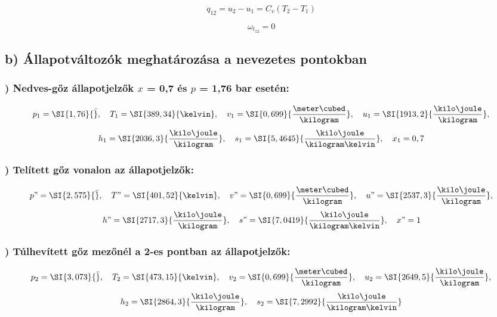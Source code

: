 \begin{equation}
	q_{12}=u_2-u_1=C_v(T_2-T_1)
\end{equation}

\begin{equation}
	\omega_{t_{12}}=0	
\end{equation}

\subsection*{b) Állapotváltozók meghatározása a nevezetes pontokban}
\subsubsection{) Nedves-gőz állapotjelzők $x$ = 0,7 és $p$ = 1,76 bar esetén:}
\begin{equation}
	p_1=\SI{1,76}{\bar},
	\quad
	T_1=\SI{389,34}{\kelvin},
	\quad
	v_1=\SI{0,699}{\frac{\meter\cubed}{\kilogram}},
	\quad
	u_1=\SI{1913,2}{\frac{\kilo\joule}{\kilogram}},
\end{equation}
\begin{equation}
	h_1=\SI{2036,3}{\frac{\kilo\joule}{\kilogram}},
	\quad
	s_1=\SI{5,4645}{\frac{\kilo\joule}{\kilogram\kelvin}},
	\quad
	x_1=0,7
\end{equation}

\subsubsection{) Telített gőz vonalon az állapotjelzők:}
\begin{equation}
	p"=\SI{2,575}{\bar},
	\quad
	T"=\SI{401,52}{\kelvin},
	\quad
	v"=\SI{0,699}{\frac{\meter\cubed}{\kilogram}},
	\quad
	u"=\SI{2537,3}{\frac{\kilo\joule}{\kilogram}},
\end{equation}
\begin{equation}
	h"=\SI{2717,3}{\frac{\kilo\joule}{\kilogram}},
	\quad
	s"=\SI{7,0419}{\frac{\kilo\joule}{\kilogram\kelvin}},
	\quad
	x"=1
\end{equation}

\subsubsection{) Túlhevített gőz mezőnél a 2-es pontban az állapotjelzők:}
\begin{equation}
	p_2=\SI{3,073}{\bar},
	\quad
	T_2=\SI{473,15}{\kelvin},
	\quad
	v_2=\SI{0,699}{\frac{\meter\cubed}{\kilogram}},
	\quad
	u_2=\SI{2649,5}{\frac{\kilo\joule}{\kilogram}},
\end{equation}
\begin{equation}
	h_2=\SI{2864,3}{\frac{\kilo\joule}{\kilogram}},
	\quad
	s_2=\SI{7,2992}{\frac{\kilo\joule}{\kilogram\kelvin}}
\end{equation}


